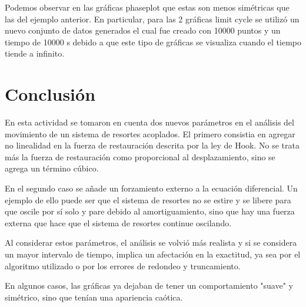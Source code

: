 \documentclass[a4paper]{article}
\begin{document}
Podemos observar en las gráficas phaseplot que estas son menos simétricas que las del ejemplo anterior. 
En particular, para las 2 gráficas limit cycle se utilizó un nuevo conjunto de datos generados el cual fue creado con 10000 puntos y un tiempo de 10000 s debido a que este tipo de gráficas se visualiza cuando el tiempo tiende a infinito.

\section{Conclusión}

En esta actividad se tomaron en cuenta dos nuevos parámetros en el análisis del movimiento de un sistema de resortes acoplados. El primero consistia en agregar no linealidad en la fuerza de restauración descrita por la ley de Hook. No se trata más la fuerza de restauración como proporcional al desplazamiento, sino se agrega un término cúbico. 

En el segundo caso se añade un forzamiento externo a la ecuación diferencial. Un ejemplo de ello puede ser que el sistema de resortes no se estire y se libere para que oscile por sí solo y pare debido al amortiguamiento, sino que hay una fuerza externa que hace que el sistema de resortes continue oscilando. 

Al considerar estos parámetros, el análisis se volvió más realista y si se considera un mayor intervalo de tiempo, implica un afectación en la exactitud, ya sea por el algoritmo utilizado o por los errores de redondeo y truncamiento. 

En algunos casos, las gráficas ya dejaban de tener un comportamiento "suave" y simétrico, sino que tenían una apariencia caótica. 
\end{document}
